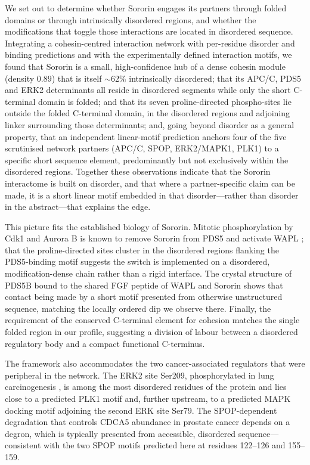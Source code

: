 \documentclass[11pt]{article}
\begin{document}
We set out to determine whether Sororin engages its partners through folded domains or through intrinsically disordered regions, and whether the modifications that toggle those interactions are located in disordered sequence. Integrating a cohesin-centred interaction network with per-residue disorder and binding predictions and with the experimentally defined interaction motifs, we found that Sororin is a small, high-confidence hub of a dense cohesin module (density $0.89$) that is itself $\sim\!62\%$ intrinsically disordered; that its APC/C, PDS5 and ERK2 determinants all reside in disordered segments while only the short C-terminal domain is folded; and that its seven proline-directed phospho-sites lie outside the folded C-terminal domain, in the disordered regions and adjoining linker surrounding those determinants; and, going beyond disorder as a general property, that an independent linear-motif prediction anchors four of the five scrutinised network partners (APC/C, SPOP, ERK2/MAPK1, PLK1) to a specific short sequence element, predominantly but not exclusively within the disordered regions. Together these observations indicate that the Sororin interactome is built on disorder, and that where a partner-specific claim can be made, it is a short linear motif embedded in that disorder---rather than disorder in the abstract---that explains the edge.

This picture fits the established biology of Sororin. Mitotic phosphorylation by Cdk1 and Aurora B is known to remove Sororin from PDS5 and activate WAPL \citep{nishiyama2013,dreier2011}; that the proline-directed sites cluster in the disordered regions flanking the PDS5-binding motif suggests the switch is implemented on a disordered, modification-dense chain rather than a rigid interface. The crystal structure of PDS5B bound to the shared FGF peptide of WAPL and Sororin \citep{ouyang2016} shows that contact being made by a short motif presented from otherwise unstructured sequence, matching the locally ordered dip we observe there. Finally, the requirement of the conserved C-terminal element for cohesion \citep{wu2011} matches the single folded region in our profile, suggesting a division of labour between a disordered regulatory body and a compact functional C-terminus.

The framework also accommodates the two cancer-associated regulators that were peripheral in the network. The ERK2 site Ser209, phosphorylated in lung carcinogenesis \citep{nguyen2010}, is among the most disordered residues of the protein and lies close to a predicted PLK1 motif and, further upstream, to a predicted MAPK docking motif adjoining the second ERK site Ser79. The SPOP-dependent degradation that controls CDCA5 abundance in prostate cancer \citep{zhang2021} depends on a degron, which is typically presented from accessible, disordered sequence---consistent with the two SPOP motifs predicted here at residues 122--126 and 155--159.
\end{document}
